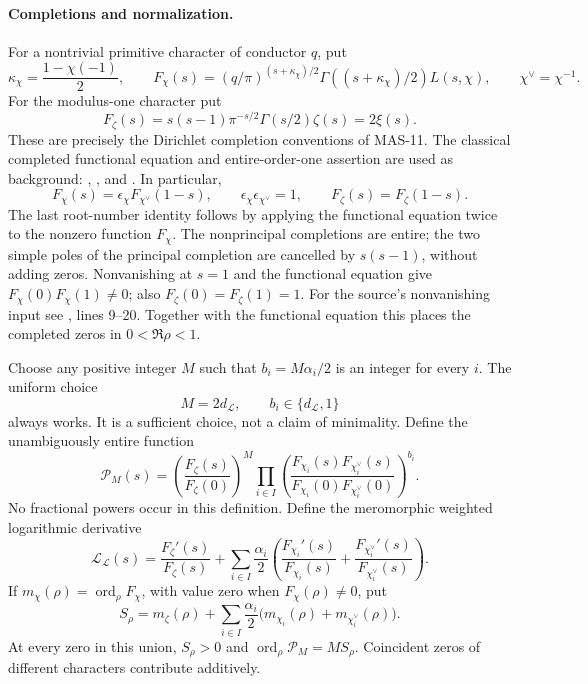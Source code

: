 \documentclass[11pt,a4paper]{article}
\newcommand{\fid}[1]{\textsf{#1}}
\begin{document}
\paragraph{Completions and normalization.}
For a nontrivial primitive character of conductor $q$, put
\[
 \kappa_\chi=\frac{1-\chi(-1)}2,\qquad
 F_\chi(s)=
 (q/\pi)^{(s+\kappa_\chi)/2}
 \Gamma((s+\kappa_\chi)/2)L(s,\chi),
 \qquad \chi^\vee=\chi^{-1}.
\]
For the modulus-one character put
\[
 F_\zeta(s)=s(s-1)\pi^{-s/2}\Gamma(s/2)\zeta(s)=2\xi(s).
\]
These are precisely the Dirichlet completion conventions of
\fid{MAS-11}. The classical completed functional equation and
entire-order-one assertion are used as background:
\cite[(25.15.5)--(25.15.6)]{dlmf2515},
\cite[\S6.1; (6.2.2)]{kedlayaFE}, and
\cite[\S1, p.~282]{rajan1998}.
In particular,
\[
 F_\chi(s)=\epsilon_\chi F_{\chi^\vee}(1-s),
 \qquad \epsilon_\chi\epsilon_{\chi^\vee}=1,\qquad
 F_\zeta(s)=F_\zeta(1-s).
\]
The last root-number identity follows by applying the functional equation
twice to the nonzero function $F_\chi$.
The nonprincipal completions are entire; the two simple poles of the
principal completion are cancelled by $s(s-1)$, without adding zeros.
Nonvanishing at $s=1$ and the functional equation give
$F_\chi(0)F_\chi(1)\ne0$; also
$F_\zeta(0)=F_\zeta(1)=1$.
For the source's nonvanishing input see
,
lines 9--20. Together with the functional equation this places the
completed zeros in $0<\Re\rho<1$.

Choose any positive integer $M$ such that
$b_i=M\alpha_i/2$ is an integer for every $i$.
The uniform choice
\[
 M=2d_{\mathcal L},\qquad
 b_i\in\{d_{\mathcal L},1\}
\]
always works. It is a sufficient choice, not a claim of minimality.
Define the unambiguously entire function
\begin{equation}\label{eq:DET18completedproduct}
 \mathscr P_M(s)=
 \left(\frac{F_\zeta(s)}{F_\zeta(0)}\right)^M
 \prod_{i\in I}
 \left(
 \frac{F_{\chi_i}(s)F_{\chi_i^\vee}(s)}
 {F_{\chi_i}(0)F_{\chi_i^\vee}(0)}
 \right)^{b_i}.
\end{equation}
No fractional powers occur in this definition. Define the meromorphic
weighted logarithmic derivative
\begin{equation}\label{eq:DET18weightedlog}
 \mathscr L_{\mathcal L}(s)=
 \frac{F_\zeta'(s)}{F_\zeta(s)}
 +\sum_{i\in I}\frac{\alpha_i}{2}
 \left(
 \frac{F_{\chi_i}'(s)}{F_{\chi_i}(s)}
 +\frac{F_{\chi_i^\vee}'(s)}{F_{\chi_i^\vee}(s)}
 \right).
\end{equation}
If $m_\chi(\rho)=\operatorname{ord}_\rho F_\chi$, with value zero
when $F_\chi(\rho)\ne0$, put
\begin{equation}\label{eq:DET18weightedmultiplicity}
 S_\rho=m_\zeta(\rho)+
 \sum_{i\in I}\frac{\alpha_i}{2}
 \bigl(m_{\chi_i}(\rho)+m_{\chi_i^\vee}(\rho)\bigr).
\end{equation}
At every zero in this union, $S_\rho>0$ and
$\operatorname{ord}_\rho\mathscr P_M=MS_\rho$.
Coincident zeros of different characters contribute additively.
\end{document}
